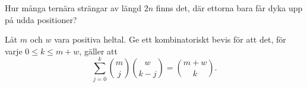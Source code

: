 \documentclass[nobib]{tufte-handout}
\begin{document}
\begin{xca}
  Hur många ternära strängar av längd $2n$ finns det, där ettorna bara får dyka upp på udda positioner?
\end{xca}

\begin{xca}
  Låt $m$ och $w$ vara positiva heltal. Ge ett kombinatoriskt bevis för att det, för varje $0 \leq k \leq m + w$, gäller att
  $$\sum_{j=0}^k \binom{m}{j}\binom{w}{k-j} = \binom{m + w}{k}.$$
\end{xca}

%
%
\end{document}
